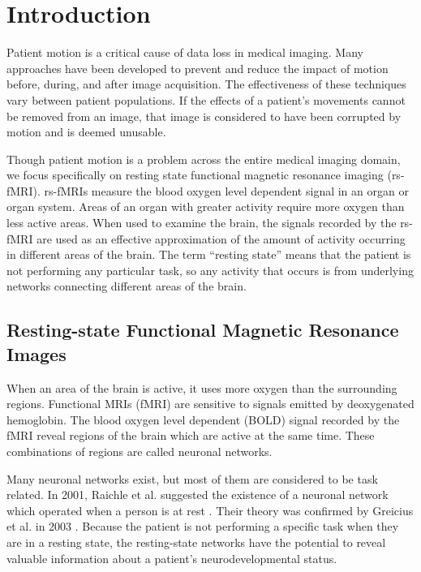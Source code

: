 \chapter{Introduction}
\label{ch:intro}

Patient motion is a critical cause of data loss in medical imaging. Many approaches have been developed to prevent and reduce the impact of motion before, during, and after image acquisition. The effectiveness of these techniques vary between patient populations. If the effects of a patient's movements cannot be removed from an image, that image is considered to have been corrupted by motion and is deemed unusable.

Though patient motion is a problem across the entire medical imaging domain, we focus specifically on resting state functional magnetic resonance imaging (rs-fMRI). rs-fMRIs measure the blood oxygen level dependent signal in an organ or organ system. Areas of an organ with greater activity require more oxygen than less active areas. When used to examine the brain, the signals recorded by the rs-fMRI are used as an effective approximation of the amount of activity occurring in different areas of the brain. The term ``resting state'' means that the patient is not performing any particular task, so any activity that occurs is from underlying networks connecting different areas of the brain. 

\section{Resting-state Functional Magnetic Resonance Images}

When an area of the brain is active, it uses more oxygen than the surrounding regions. Functional MRIs (fMRI) are sensitive to signals emitted by deoxygenated hemoglobin. The blood oxygen level dependent (BOLD) signal recorded by the fMRI reveal regions of the brain which are active at the same time. These combinations of regions are called neuronal networks. 

Many neuronal networks exist, but most of them are considered to be task related. In 2001, Raichle et al. suggested the existence of a neuronal network which operated when a person is at rest \cite{Raichle2001}. Their theory was confirmed by Greicius et al. in 2003 \cite{Greicius2003}. Because the patient is not performing a specific task when they are in a resting state, the resting-state networks have the potential to reveal valuable information about a patient's neurodevelopmental status.

